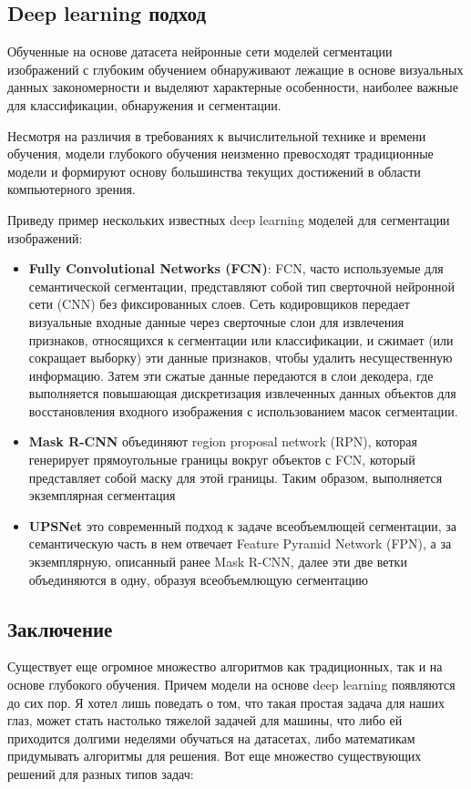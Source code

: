 \subsection{Deep learning подход}

Обученные на основе датасета нейронные сети моделей сегментации изображений с глубоким обучением обнаруживают лежащие в основе визуальных данных закономерности и выделяют характерные особенности, наиболее важные для классификации, обнаружения и сегментации.

Несмотря на различия в требованиях к вычислительной технике и времени обучения, модели глубокого обучения неизменно превосходят традиционные модели и формируют основу большинства текущих достижений в области компьютерного зрения.

Приведу пример нескольких известных deep learning моделей для сегментации изображений:

\begin{itemize}
    \item \textbf{Fully Convolutional Networks  (FCN)}: FCN, часто используемые для семантической сегментации, представляют собой тип сверточной нейронной сети (CNN) без фиксированных слоев. Сеть кодировщиков передает визуальные входные данные через сверточные слои для извлечения признаков, относящихся к сегментации или классификации, и сжимает (или сокращает выборку) эти данные признаков, чтобы удалить несущественную информацию. Затем эти сжатые данные передаются в слои декодера, где выполняется повышающая дискретизация извлеченных данных объектов для восстановления входного изображения с использованием масок сегментации.
    \item \textbf{Mask R-CNN} объединяют region proposal network (RPN), которая генерирует прямоугольные границы вокруг объектов с FCN, который представляет собой маску для этой границы. Таким образом, выполняется экземплярная сегментация
    \item \textbf{UPSNet} это современный подход к задаче всеобъемлющей сегментации, за семантическую часть в нем отвечает Feature Pyramid Network (FPN), а за экземплярную, описанный ранее Mask R-CNN, далее эти две ветки объединяются в одну, образуя всеобъемлющую сегментацию
\end{itemize}

\subsection{Заключение}

Существует еще огромное множество алгоритмов как традиционных, так и на основе глубокого обучения. Причем модели на основе deep learning появляются до сих пор. Я хотел лишь поведать о том, что такая простая задача для наших глаз, может стать настолько тяжелой задачей для машины, что либо ей приходится долгими неделями обучаться на датасетах, либо математикам придумывать алгоритмы для решения. Вот еще множество существующих решений для разных типов задач:

